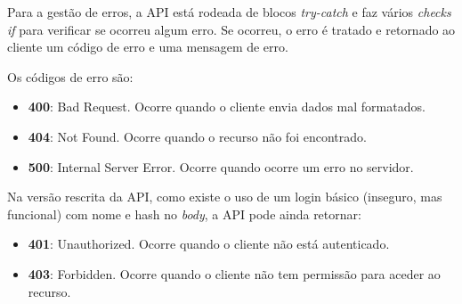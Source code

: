 Para a gestão de erros, a API está rodeada de blocos \textit{try-catch} e faz vários \textit{checks if} para verificar se ocorreu algum erro. Se ocorreu, o erro é tratado e retornado ao cliente um código de erro e uma mensagem de erro.

Os códigos de erro são:

\begin{itemize}
  \item \textbf{400}: Bad Request. Ocorre quando o cliente envia dados mal
  formatados.
  \item \textbf{404}: Not Found. Ocorre quando o recurso não foi encontrado.
  \item \textbf{500}: Internal Server Error. Ocorre quando ocorre um erro no
  servidor.
\end{itemize}

Na versão rescrita da API, como existe o uso de um login básico (inseguro, mas funcional) com nome e hash no \textit{body}, a API pode ainda retornar:

\begin{itemize}
  \item \textbf{401}: Unauthorized. Ocorre quando o cliente não está
  autenticado.
  \item \textbf{403}: Forbidden. Ocorre quando o cliente não tem permissão
  para aceder ao recurso.
\end{itemize}
